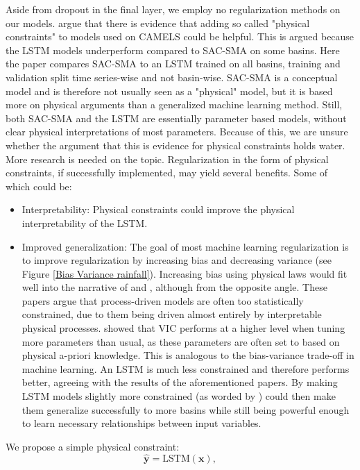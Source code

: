 Aside from dropout in the final layer, we employ no regularization methods on 
our models. \citet{lstm_third_paper} 
argue that there is evidence that adding so called "physical constraints" to 
models used on CAMELS could be helpful. This is argued because the LSTM models 
underperform compared to SAC-SMA on some basins. Here the paper compares SAC-SMA 
to an LSTM trained on all basins, training and validation split time series-wise 
and not basin-wise. SAC-SMA is a conceptual model and is therefore not usually seen 
as a "physical" model, but it is based more on physical arguments than a 
generalized machine learning method. Still, both SAC-SMA and the LSTM are essentially 
parameter based models, without clear physical interpretations of most parameters. 
Because of this, we are unsure whether the argument that this is evidence for physical 
constraints holds water. More research is needed on the topic. Regularization in 
the form of physical constraints, if successfully implemented, may yield several 
benefits. Some of which could be:
\begin{itemize}
\item Interpretability: Physical constraints could improve the physical interpretability 
of the LSTM.
\item Improved generalization: The goal of most machine learning regularization is 
to improve regularization by increasing bias and decreasing variance (see Figure 
\ref{Bias Variance rainfall}). Increasing bias using physical laws would fit well 
into the narrative of \citet{BiasVarianceVIC} and \citet{VICbench}, although from 
the opposite angle. These papers argue that process-driven models are often too 
statistically constrained, due to them being driven almost entirely by interpretable 
physical processes. \citet{VICbench} showed that VIC performs at a higher level 
when tuning more parameters than usual, as these parameters are often set to based 
on physical a-priori knowledge. This is analogous to the bias-variance trade-off 
in machine learning. An LSTM is much less constrained and therefore performs better, 
agreeing with the results of the aforementioned papers. By making LSTM models 
slightly more constrained (as worded by \citet{BiasVarianceVIC}) could then make 
them generalize successfully to more basins while still being powerful enough to 
learn necessary relationships between input variables.
\end{itemize}
We propose a simple physical constraint:
\begin{equation}
\bm{\hat{y}} = \text{LSTM}(\bm{x}),
\end{equation}
